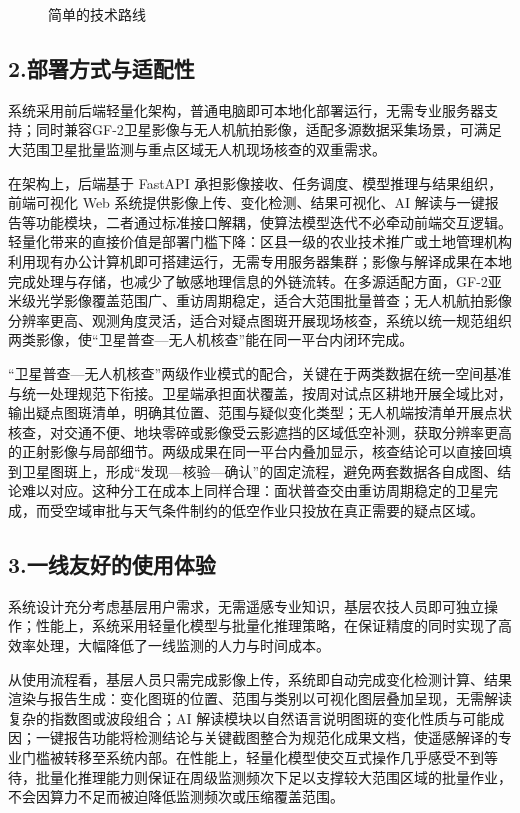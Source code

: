 \begin{figure}[htbp]
    \centering
    \caption{简单的技术路线}
    \label{fig:9}
\end{figure}

\subsection{2.部署方式与适配性}

系统采用前后端轻量化架构，普通电脑即可本地化部署运行，无需专业服务器支持；同时兼容GF-2卫星影像与无人机航拍影像，适配多源数据采集场景，可满足大范围卫星批量监测与重点区域无人机现场核查的双重需求。

在架构上，后端基于 FastAPI 承担影像接收、任务调度、模型推理与结果组织，前端可视化 Web 系统提供影像上传、变化检测、结果可视化、AI 解读与一键报告等功能模块，二者通过标准接口解耦，使算法模型迭代不必牵动前端交互逻辑。轻量化带来的直接价值是部署门槛下降：区县一级的农业技术推广或土地管理机构利用现有办公计算机即可搭建运行，无需专用服务器集群；影像与解译成果在本地完成处理与存储，也减少了敏感地理信息的外链流转。在多源适配方面，GF-2亚米级光学影像覆盖范围广、重访周期稳定，适合大范围批量普查；无人机航拍影像分辨率更高、观测角度灵活，适合对疑点图斑开展现场核查，系统以统一规范组织两类影像，使“卫星普查—无人机核查”能在同一平台内闭环完成。

“卫星普查—无人机核查”两级作业模式的配合，关键在于两类数据在统一空间基准与统一处理规范下衔接。卫星端承担面状覆盖，按周对试点区耕地开展全域比对，输出疑点图斑清单，明确其位置、范围与疑似变化类型；无人机端按清单开展点状核查，对交通不便、地块零碎或影像受云影遮挡的区域低空补测，获取分辨率更高的正射影像与局部细节。两级成果在同一平台内叠加显示，核查结论可以直接回填到卫星图斑上，形成“发现—核验—确认”的固定流程，避免两套数据各自成图、结论难以对应。这种分工在成本上同样合理：面状普查交由重访周期稳定的卫星完成，而受空域审批与天气条件制约的低空作业只投放在真正需要的疑点区域。

\subsection{3.一线友好的使用体验}

系统设计充分考虑基层用户需求，无需遥感专业知识，基层农技人员即可独立操作；性能上，系统采用轻量化模型与批量化推理策略，在保证精度的同时实现了高效率处理，大幅降低了一线监测的人力与时间成本。

从使用流程看，基层人员只需完成影像上传，系统即自动完成变化检测计算、结果渲染与报告生成：变化图斑的位置、范围与类别以可视化图层叠加呈现，无需解读复杂的指数图或波段组合；AI 解读模块以自然语言说明图斑的变化性质与可能成因；一键报告功能将检测结论与关键截图整合为规范化成果文档，使遥感解译的专业门槛被转移至系统内部。在性能上，轻量化模型使交互式操作几乎感受不到等待，批量化推理能力则保证在周级监测频次下足以支撑较大范围区域的批量作业，不会因算力不足而被迫降低监测频次或压缩覆盖范围。

